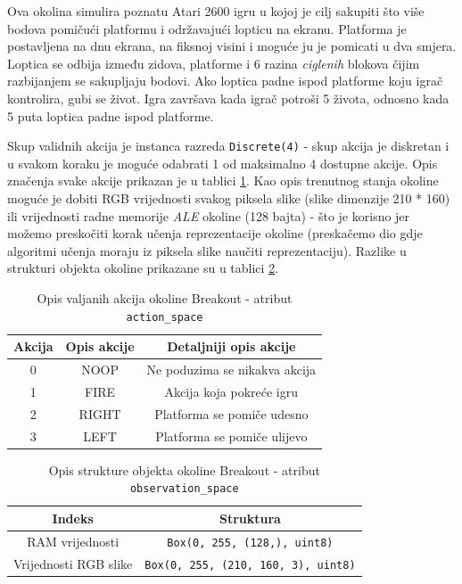 Ova okolina simulira poznatu Atari 2600 igru u kojoj je cilj sakupiti što više bodova pomičući platformu i održavajući lopticu na ekranu. Platforma je postavljena na dnu ekrana, na fiksnoj visini i moguće ju je pomicati u dva smjera. Loptica se odbija između zidova, platforme i 6 razina \textit{ciglenih} blokova čijim razbijanjem se sakupljaju bodovi. Ako loptica padne ispod platforme koju igrač kontrolira, gubi se život. Igra završava kada igrač potroši 5 života, odnosno kada 5 puta loptica padne ispod platforme. 

Skup validnih akcija je instanca razreda \texttt{Discrete(4)} - skup akcija je diskretan i u svakom koraku je moguće odabrati 1 od maksimalno 4 dostupne akcije. Opis značenja svake akcije prikazan je u tablici \ref{table:breakout-action}. Kao opis trenutnog stanja okoline moguće je dobiti RGB vrijednosti svakog piksela slike (slike dimenzije 210 * 160) ili vrijednosti radne memorije \textit{ALE} okoline (128 bajta) - što je korisno jer možemo preskočiti korak učenja reprezentacije okoline (preskačemo dio gdje algoritmi učenja moraju iz piksela slike naučiti reprezentaciju). Razlike u strukturi objekta okoline prikazane su u tablici \ref{table:breakout-observation}. 

\begin{table}[ht]
    \centering
    \caption{Opis valjanih akcija okoline Breakout - atribut \texttt{action_space}}
    \begin{tabular}{c c c}
        \hline
        Akcija & Opis akcije & Detaljniji opis akcije  \\
        \hline
        0 & NOOP & Ne poduzima se nikakva akcija \\
        1 & FIRE & Akcija koja pokreće igru \\ 
        2 & RIGHT & Platforma se pomiče udesno \\ 
        3 & LEFT & Platforma se pomiče ulijevo  \\ 
    \end{tabular}
    \label{table:breakout-action}
\end{table}

\begin{table}[H]
    \centering
    \caption{Opis strukture objekta okoline Breakout - atribut \texttt{observation_space}}
    \begin{tabular}{c c}
        \hline
        Indeks & Struktura  \\
        \hline
        RAM vrijednosti & \texttt{Box(0, 255, (128,), uint8)}  \\ 
        Vrijednosti RGB slike & \texttt{Box(0, 255, (210, 160, 3), uint8)}  \\
    \end{tabular}
    \label{table:breakout-observation}
\end{table}

